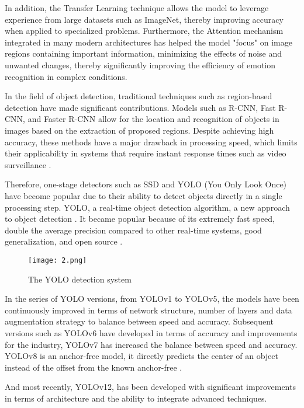 \documentclass[a4paper,13pt]{report}
\begin{document}
\newpage In addition, the Transfer Learning technique allows the model to leverage experience from large datasets such as ImageNet, thereby improving accuracy when applied to specialized problems. Furthermore, the Attention mechanism integrated in many modern architectures has helped the model "focus" on image regions containing important information, minimizing the effects of noise and unwanted changes, thereby significantly improving the efficiency of emotion recognition in complex conditions.

In the field of object detection, traditional techniques such as region-based detection have made significant contributions. Models such as R-CNN, Fast R-CNN, and Faster R-CNN allow for the location and recognition of objects in images based on the extraction of proposed regions. Despite achieving high accuracy, these methods have a major drawback in processing speed, which limits their applicability in systems that require instant response times such as video surveillance \cite{thang2020}. 

Therefore, one-stage detectors such as SSD and YOLO (You Only Look Once) have become popular due to their ability to detect objects directly in a single processing step. YOLO, a real-time object detection algorithm, a new approach to object detection \cite{redmon2016}. It became popular because of its extremely fast speed, double the average precision compared to other real-time systems, good generalization, and open source \cite{yoloexplained}.  

\begin{figure}[H]
  \centering
  \texttt{[image: 2.png]}
  \caption{The YOLO detection system \cite{redmon2016}}
  \label{fig:lit}
\end{figure}

In the series of YOLO versions, from YOLOv1 to YOLOv5, the models have been continuously improved in terms of network structure, number of layers and data augmentation strategy to balance between speed and accuracy. Subsequent versions such as YOLOv6 have developed in terms of accuracy and improvements for the industry, YOLOv7 has increased the balance between speed and accuracy. YOLOv8 is an anchor-free model, it directly predicts the center of an object instead of the offset from the known anchor-free \cite{yolo2023}. 

And most recently, YOLOv12, has been developed with significant improvements in terms of architecture and the ability to integrate advanced techniques.
\end{document}

